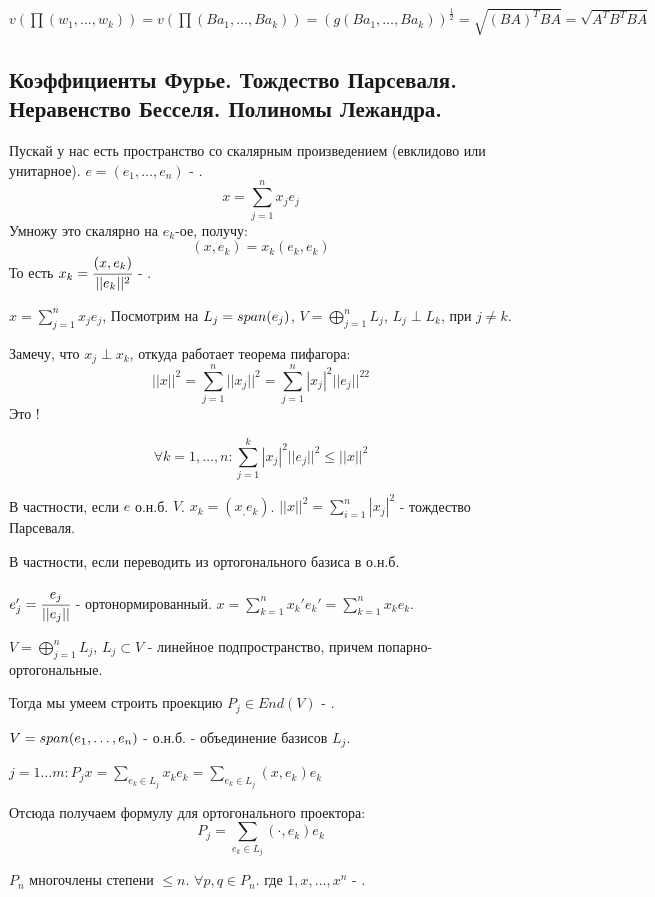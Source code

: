 $v(\prod (w_1,\ldots, w_k)) =v(\prod(Ba_1,\ldots, Ba_k))= (g(Ba_1,\ldots, Ba_k))^{\frac{1}{2}} =\sqrt{(BA)^T BA} = \sqrt{A^TB^TBA}$
\pagebreak
\subsection{Коэффициенты Фурье. Тождество Парсеваля.  Неравенство Бесселя. Полиномы Лежандра.}

Пускай у нас есть пространство со скалярным произведением (евклидово или унитарное). $e =(e_1,\ldots, e_n)$ - .
$$x = \sum\limits_{j=1}^n x_je_j$$
Умножу это скалярно на $e_k$-ое, получу:
$$(x,e_k) = x_k (e_k,e_k)$$
То есть $x_k = \cfrac{(x,e_k)}{||e_k||^2}$ - .

$x = \sum\limits_{j=1}^n x_j e_j$, Посмотрим на $L_j = span(e_j)$, $V = \bigoplus\limits_{j=1}^nL_j$, $L_j \perp L_k$, при $j\neq k$.

Замечу, что $x_j\perp x_k$, откуда работает теорема пифагора:
$$||x||^2 =\sum\limits_{j=1}^n ||x_j||^2 = \sum\limits_{j=1}^n |x_j|^2 ||e_j||^22$$ 
Это !

$$\forall k =1,\ldots, n: \sum\limits_{j=1}^k |x_j|^2||e_j||^2\leq ||x||^2$$

В частности, если $e$ о.н.б. $V$. $x_k = (x_,e_k)$. $||x||^2 = \sum\limits_{i=1}^n |x_j|^2$ - тождество Парсеваля.

В частности, если переводить из ортогонального базиса в о.н.б. 

$e_j' = \cfrac{e_j}{||e_j||}$ - ортонормированный. $x = \sum\limits_{k=1}^n x_k' e_k' = \sum\limits_{k=1}^n x_k e_k$.

 $V =\bigoplus\limits_{j=1}^n L_j$, $L_j \subset V$ - линейное подпространство, причем попарно-ортогональные. 

Тогда мы умеем строить проекцию $P_j \in End(V)$ - .

$V = span (e_1,\ldots ,e_n)$ - о.н.б. - объединение базисов $L_j$.

$j = 1\ldots m: P_j x = \sum\limits_{e_k \in L_j}x_k e_k = \sum\limits_{e_k\in L_j}(x,e_k)e_k$

Отсюда получаем формулу для ортогонального проектора:
$$P_j  = \sum\limits_{e_k\in L_j} (\cdot , e_k)e_k$$


$P_n$ многочлены степени $\leq n$. $\forall p,q \in P_n$. где $1, x , \ldots, x^n$ - .


